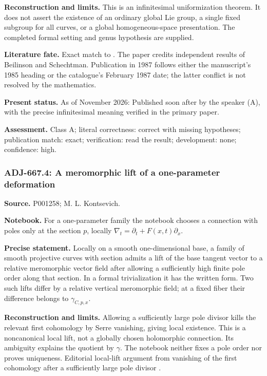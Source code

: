 \noindent\textbf{Reconstruction and limits.} This is an infinitesimal uniformization theorem. It does not assert the existence of an ordinary global Lie group, a single fixed subgroup for all curves, or a global homogeneous-space presentation. The completed formal setting and genus hypothesis are supplied.\par

\noindent\textbf{Literature fate.} Exact match to \citet[\S1, proposition and preceding tangent formula]{kontsevich1987virasoro}. The paper credits independent results of Beilinson and Schechtman. Publication in 1987 follows either the manuscript's 1985 heading or the catalogue's February 1987 date; the latter conflict is not resolved by the mathematics.\par

\noindent\textbf{Present status.} As of November 2026: Published soon after by the speaker (A), with the precise infinitesimal meaning verified in the primary paper.\par

\noindent\textbf{Assessment.} Class A; literal correctness: correct with missing hypotheses; publication match: exact; verification: read the result; development: none; confidence: high.\par

\subsubsection{ADJ-667.4: A meromorphic lift of a one-parameter deformation}
\noindent\textbf{Source.} P001258; M. L. Kontsevich.\par
\noindent\textbf{Notebook.} For a one-parameter family the notebook chooses a connection with poles only at the section \(p\), locally \(\nabla_t=\partial_t+F(x,t)\partial_x\).\par

\noindent\textbf{Precise statement.} Locally on a smooth one-dimensional base, a family of smooth projective curves with section admits a lift of the base tangent vector to a relative meromorphic vector field after allowing a sufficiently high finite pole order along that section. In a formal trivialization it has the written form. Two such lifts differ by a relative vertical meromorphic field; at a fixed fiber their difference belongs to \(\gamma_{C,p,x}\).\par

\noindent\textbf{Reconstruction and limits.} Allowing a sufficiently large pole divisor kills the relevant first cohomology by Serre vanishing, giving local existence. This is a noncanonical local lift, not a globally chosen holomorphic connection. Its ambiguity explains the quotient by \(\gamma\). The notebook neither fixes a pole order nor proves uniqueness. Editorial local-lift argument from vanishing of the first cohomology after a sufficiently large pole divisor \ours.\par

